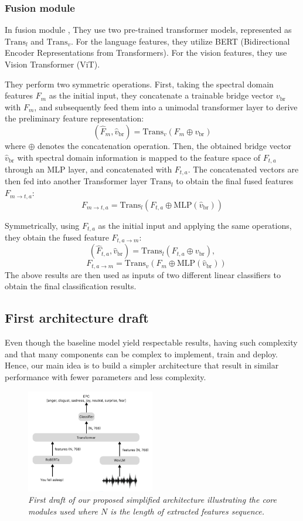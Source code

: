 \documentclass{article}
\begin{document}
\subsubsection{Fusion module}
In fusion module , They use two pre-trained transformer models, represented as $\text{Trans}_l$ and $\text{Trans}_v$. For the language features, they utilize BERT (Bidirectional Encoder Representations from Transformers). For the vision features, they use Vision Transformer (ViT).

They perform two symmetric operations. First, taking the spectral domain features $F_m$ as the initial input, they concatenate a trainable bridge vector $v_{\text{br}}$ with $F_m$, and subsequently feed them into a unimodal transformer layer to derive the preliminary feature representation:
\[
(\hat{F}_m, \hat{v}_{\text{br}}) = \text{Trans}_v(F_m \oplus v_{\text{br}})
\]
where $\oplus$ denotes the concatenation operation. Then, the obtained bridge vector $\hat{v}_{\text{br}}$ with spectral domain information is mapped to the feature space of $F_{t,a}$ through an MLP layer, and concatenated with $F_{t,a}$. The concatenated vectors are then fed into another Transformer layer $\text{Trans}_l$ to obtain the final fused features $F_{m \rightarrow t,a}$:
\[
F_{m \rightarrow t,a} = \text{Trans}_l(F_{t,a} \oplus \text{MLP}(\hat{v}_{\text{br}}))
\]

Symmetrically, using $F_{t,a}$ as the initial input and applying the same operations, they obtain the fused feature $F_{t,a \rightarrow m}$:
\[
(\hat{F}_{t,a}, \hat{v}_{\text{br}}) = \text{Trans}_l(F_{t,a} \oplus v_{\text{br}}),
\]
\[
 \quad
F_{t,a \rightarrow m} = \text{Trans}_v(F_m \oplus \text{MLP}(\hat{v}_{\text{br}}))
\]
The above results are then used as inputs of two different linear classifiers to obtain the final classification results.

\subsection{First architecture draft}
Even though the baseline model yield respectable results, having such complexity and that many components can be complex to implement, train and deploy. Hence, our main idea is to build a simpler architecture that result in similar performance with fewer parameters and less complexity.

\begin{figure}[htbp]
  \centering
  \includegraphics[width=0.5\textwidth]{Images/architecture_draft.png}
  \caption{\textit{First draft of our proposed simplified architecture illustrating the core modules used where $N$ is the length of extracted features sequence.}}
  \label{fig:DraftArchitecture}
\end{figure}
\end{document}
